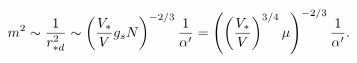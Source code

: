 \begin{equation}
m^{2}\sim {1\over r^{2}_{*d}}\sim 
\left({V_{*}\over V}g_{s}N\right)^{-{2/3}}{1\over \alpha'}
=\left(\left({V_{*}\over V}\right)^{3/ 4}\mu\right)^{-{2/ 3}}
{1\over \alpha'}.
\end{equation}

